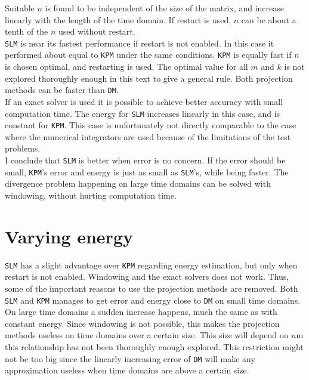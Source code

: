 \noindent Suitable $n$ is found to be independent of the size of the matrix, and increase linearly with the length of the time domain. If restart is used, $n$ can be about a tenth of the $n$ used without restart.\\

\noindent \texttt{SLM} is near its fastest performance if restart is not enabled. In this case it performed about equal to \texttt{KPM} under the same conditions. \texttt{KPM} is equally fast if $n$ is chosen optimal, and restarting is used. The optimal value for all $m$ and $k$ is not explored thoroughly enough in this text to give a general rule. Both projection methods can be faster than \texttt{DM}. \\

\noindent If an exact solver is used it is possible to achieve better accuracy with small computation time. The energy for \texttt{SLM} increases linearly in this case, and is constant for \texttt{KPM}. This case is unfortunately not directly comparable to the case where the numerical integrators are used because of the limitations of the test problems. \\

\noindent I conclude that \texttt{SLM} is better when error is no concern. If the error should be small, \texttt{KPM}'s error and energy is just as small as \texttt{SLM}'s, while being faster. The divergence problem happening on large time domains can be solved with windowing, without hurting computation time. %
\section{Varying energy} %
\texttt{SLM} has a slight advantage over \texttt{KPM} regarding energy estimation, but only when restart is not enabled. 
Windowing and the exact solvers does not work. Thus, some of the important reasons to use the projection methods are removed. Both \texttt{SLM} and \texttt{KPM} manages to get error and energy close to \texttt{DM} on small time domains. On large time domains a sudden increase happens, much the same as with constant energy. Since windowing is not possible, this makes the projection methods useless on time domains over a certain size. This size will depend on $n$m this relationship has not been thoroughly enough explored. This restriction might not be too big since the linearly increasing error of \texttt{DM} will make any approximation useless when time domains are above a certain size.\\

